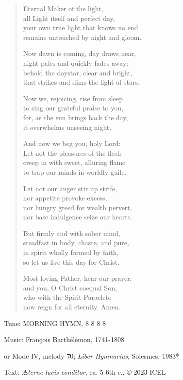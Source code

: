 \hymn

\begin{verse}
Eternal Maker of the light,\\
all Light itself and perfect day,\\
your own true light that knows no end\\
remains untouched by night and gloom.

Now dawn is coming, day draws near,\\
night pales and quickly fades away:\\
behold the daystar, clear and bright,\\
that strikes and dims the light of stars.

Now we, rejoicing, rise from sleep\\
to sing our grateful praise to you,\\
for, as the sun brings back the day,\\
it overwhelms unseeing night.

And now we beg you, holy Lord:\\
Let not the pleasures of the flesh\\
creep in with sweet, alluring flame\\
to trap our minds in worldly guile.

Let not our anger stir up strife,\\
nor appetite provoke excess,\\
nor hungry greed for wealth pervert,\\
nor base indulgence seize our hearts.

But firmly and with sober mind,\\
steadfast in body, chaste, and pure,\\
in spirit wholly formed by faith,\\
so let us live this day for Christ.

Most loving Father, hear our prayer,\\
and you, O Christ coequal Son,\\
who with the Spirit Paraclete\\
now reign for all eternity. Amen.
\end{verse}

\begin{hymnsource}
Tune: MORNING HYMN, 8 8 8 8

Music: François Barthélémon, 1741-1808

or Mode IV, melody 70; \emph{Liber Hymnarius}, Solesmes, 1983*

Text: \emph{Æterne lucis conditor}, ca. 5-6th c., © 2023 ICEL
\end{hymnsource}
